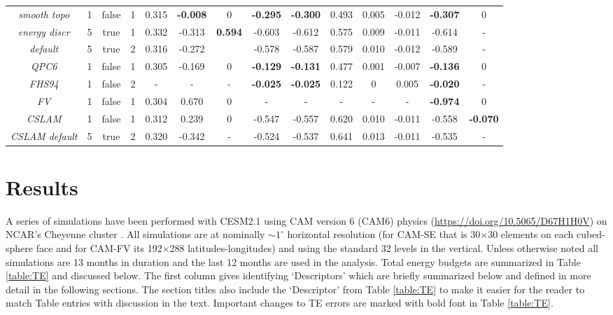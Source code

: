 \documentclass{agujournal}
\begin{document}
\begin{table}
\begin{tabular}{c|ccc|ccc|cccccc|c}
%
%
%
%
{\em{smooth topo}} & 1 & false & 1  &  0.315& {\bf{-0.008}}& 0  & {\bf{-0.295}}& {\bf{-0.300}}  &  0.493& 0.005          & -0.012& {\bf{-0.307}} & 0\\
{\em{energy discr}} & 5 & true  & 1 &  0.332& -0.313& {\bf{0.594}}& -0.603& -0.612&  0.575& 0.009          & -0.011& -0.614 & -\\
{\em{default}}      & 5 & true  & 2 &  0.316& -0.272&             & -0.578& -0.587&  0.579& 0.010          & -0.012& -0.589 & -\\ %
\hline
{\em{QPC6}}         & 1 & false & 1 &  0.305& -0.169& 0    &{\bf{-0.129}}& {\bf{-0.131}}&  0.477& 0.001 & -0.007& {\bf{-0.136}} & 0\\
{\em{FHS94}}        & 1 & false & 2 &  -    &   -   &  -   & {\bf{-0.025}}&{\bf{-0.025}} &  0.122& 0 &  0.005 & {\bf{-0.020}} & -\\
{\em{FV}}       & 1 & false & 1 &  0.304&  0.670& 0    & - & - & - & - & - & {\bf{-0.974}} & 0 \\
{\em{CSLAM}} & 1 & false & 1 &  0.312& 0.239& 0 & -0.547& -0.557&   0.620&   0.010& -0.011& -0.558& {\bf{-0.070}}\\
{\em{CSLAM default}} & 5 & true   & 2   &   0.320& -0.342&  - & -0.524& -0.537&  0.641& 0.013& -0.011& -0.535& - 
  \end{tabular}
  \end{table}

\section{Results}
\label{sec:results}
A series of simulations have been performed with CESM2.1 using CAM version 6 (CAM6) physics (\url{https://doi.org/10.5065/D67H1H0V}) on NCAR's Cheyenne cluster \citep{cheyenne}. All simulations are at nominally $\sim1^{\circ}$ horizontal resolution (for CAM-SE that is 30$\times$30 elements on each cubed-sphere face and for CAM-FV its 192$\times$288 latitudes-longitudes) and using the standard 32 levels in the vertical. Unless otherwise noted all simulations are 13 months in duration and the last 12 months are used in the analysis. Total energy budgets are summarized in Table \ref{table:TE} and discussed below. The first column gives identifying `Descriptors' which are briefly summarized below and defined in more detail in the following sections. The section titles also include the `Descriptor' from Table \ref{table:TE} to make it easier for the reader to match Table entries with discussion in the text. Important changes to TE errors are marked with bold font in Table \ref{table:TE}.
\end{document}
